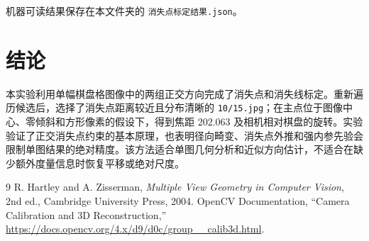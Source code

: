 \documentclass[UTF8,a4paper,12pt]{ctexart}
\begin{document}
机器可读结果保存在本文件夹的 \texttt{消失点标定结果.json}。

\section{结论}

本实验利用单幅棋盘格图像中的两组正交方向完成了消失点和消失线标定。重新遍历候选后，选择了消失点距离较近且分布清晰的 \texttt{10/15.jpg}；在主点位于图像中心、零倾斜和方形像素的假设下，得到焦距 \SI{202.063}{\pixel} 及相机相对棋盘的旋转。实验验证了正交消失点约束的基本原理，也表明径向畸变、消失点外推和强内参先验会限制单图结果的绝对精度。该方法适合单图几何分析和近似方向估计，不适合在缺少额外度量信息时恢复平移或绝对尺度。

\begin{thebibliography}{9}
 R. Hartley and A. Zisserman, \emph{Multiple View Geometry in Computer Vision}, 2nd ed., Cambridge University Press, 2004.
 OpenCV Documentation, ``Camera Calibration and 3D Reconstruction,'' \url{https://docs.opencv.org/4.x/d9/d0c/group__calib3d.html}.
\end{thebibliography}
\end{document}
